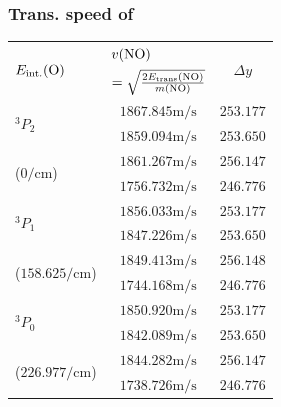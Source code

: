 \documentclass[aspectratio=43,handout]{ctexbeamer}
\begin{document}
	\subsubsection{Trans. speed of }
	\begin{frame}{\insertsubsection}{\insertsubsubsection}
\begin{table}[htbp]  
	\centering  
	\tiny   
	\begin{tabular}{l|cc}    
		\toprule
		\multicolumn{1}{l}{\multirow{2}[1]{*}{$E_\text{int.}(\ce{O})$}} & \multicolumn{1}{l}{$v(\ce{NO}) $} & \multirow{2}[1]{*}{$\Delta y $} \\    
		\multicolumn{1}{l}{} & \multicolumn{1}{l}{$= \sqrt {  \frac{2E_\text{trans}(\ce{NO})}{m(\ce{NO})}   }$} &  \\    
		\midrule
		\multirow{2}[1]{*}{$^3 P_2$} & $1867.845 \unit{\meter \per \second}$ & $253.177$ \\          
		& $1859.094 \unit{\meter \per \second}$ & $253.650$ \\    
		\multirow{2}[1]{*}{($\num{0}\unit{\per \centi \meter}$)} & $1861.267 \unit{\meter \per \second}$ & $256.147$ \\          
		& $1756.732 \unit{\meter \per \second}$ & $246.776$ \\    
		\midrule    
		\multirow{2}[1]{*}{$^3 P_1$} & $1856.033 \unit{\meter \per \second}$ & $253.177$ \\          
		& $1847.226 \unit{\meter \per \second}$ & $253.650$ \\    
		\multirow{2}[1]{*}{($\num{158.625}\unit{\per \centi \meter}$)} & $1849.413 \unit{\meter \per \second}$ & $256.148$ \\          
		& $1744.168 \unit{\meter \per \second}$ & $246.776$ \\    
		\midrule    
		\multirow{2}[1]{*}{$^3 P_0$} & $1850.920 \unit{\meter \per \second}$ & $253.177$ \\          
		& $1842.089 \unit{\meter \per \second}$ & $253.650$ \\    
		\multirow{2}[1]{*}{($\num{226.977}\unit{\per \centi \meter}$)} & $1844.282 \unit{\meter \per \second}$ & $256.147$ \\          
		& $1738.726 \unit{\meter \per \second}$ & $246.776$ \\    		
		\bottomrule    
		\end{tabular}
	\end{table}%
\end{frame}
\end{document}
